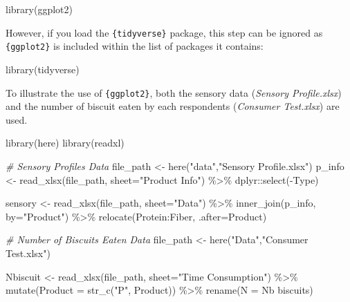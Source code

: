 \documentclass[
]{book}
\newenvironment{Shaded}{\begin{snugshade}}{\end{snugshade}}
\newcommand{\AttributeTok}[1]{\textcolor[rgb]{0.77,0.63,0.00}{#1}}
\newcommand{\CommentTok}[1]{\textcolor[rgb]{0.56,0.35,0.01}{\textit{#1}}}
\newcommand{\FunctionTok}[1]{\textcolor[rgb]{0.00,0.00,0.00}{#1}}
\newcommand{\NormalTok}[1]{#1}
\newcommand{\OtherTok}[1]{\textcolor[rgb]{0.56,0.35,0.01}{#1}}
\newcommand{\SpecialCharTok}[1]{\textcolor[rgb]{0.00,0.00,0.00}{#1}}
\newcommand{\StringTok}[1]{\textcolor[rgb]{0.31,0.60,0.02}{#1}}
\begin{document}
\begin{Shaded}
\begin{Highlighting}[]
\FunctionTok{library}\NormalTok{(ggplot2)}
\end{Highlighting}
\end{Shaded}

However, if you load the \texttt{\{tidyverse\}} package, this step can be ignored as \texttt{\{ggplot2\}} is included within the list of packages it contains:

\begin{Shaded}
\begin{Highlighting}[]
\FunctionTok{library}\NormalTok{(tidyverse)}
\end{Highlighting}
\end{Shaded}

To illustrate the use of \texttt{\{ggplot2\}}, both the sensory data (\emph{Sensory Profile.xlsx}) and the number of biscuit eaten by each respondents (\emph{Consumer Test.xlsx}) are used.

\begin{Shaded}
\begin{Highlighting}[]
\FunctionTok{library}\NormalTok{(here)}
\FunctionTok{library}\NormalTok{(readxl)}

\CommentTok{\# Sensory Profiles Data}
\NormalTok{file\_path }\OtherTok{\textless{}{-}} \FunctionTok{here}\NormalTok{(}\StringTok{"data"}\NormalTok{,}\StringTok{"Sensory Profile.xlsx"}\NormalTok{) }
\NormalTok{p\_info }\OtherTok{\textless{}{-}} \FunctionTok{read\_xlsx}\NormalTok{(file\_path, }\AttributeTok{sheet=}\StringTok{"Product Info"}\NormalTok{) }\SpecialCharTok{\%\textgreater{}\%} 
\NormalTok{  dplyr}\SpecialCharTok{::}\FunctionTok{select}\NormalTok{(}\SpecialCharTok{{-}}\NormalTok{Type)}

\NormalTok{sensory }\OtherTok{\textless{}{-}} \FunctionTok{read\_xlsx}\NormalTok{(file\_path, }\AttributeTok{sheet=}\StringTok{"Data"}\NormalTok{) }\SpecialCharTok{\%\textgreater{}\%} 
  \FunctionTok{inner\_join}\NormalTok{(p\_info, }\AttributeTok{by=}\StringTok{"Product"}\NormalTok{) }\SpecialCharTok{\%\textgreater{}\%} 
  \FunctionTok{relocate}\NormalTok{(Protein}\SpecialCharTok{:}\NormalTok{Fiber, }\AttributeTok{.after=}\NormalTok{Product)}

\CommentTok{\# Number of Biscuits Eaten Data}
\NormalTok{file\_path }\OtherTok{\textless{}{-}} \FunctionTok{here}\NormalTok{(}\StringTok{"Data"}\NormalTok{,}\StringTok{"Consumer Test.xlsx"}\NormalTok{)}

\NormalTok{Nbiscuit }\OtherTok{\textless{}{-}} \FunctionTok{read\_xlsx}\NormalTok{(file\_path, }\AttributeTok{sheet=}\StringTok{"Time Consumption"}\NormalTok{) }\SpecialCharTok{\%\textgreater{}\%} 
  \FunctionTok{mutate}\NormalTok{(}\AttributeTok{Product =} \FunctionTok{str\_c}\NormalTok{(}\StringTok{"P"}\NormalTok{, Product)) }\SpecialCharTok{\%\textgreater{}\%} 
  \FunctionTok{rename}\NormalTok{(}\AttributeTok{N =} \StringTok{\textasciigrave{}}\AttributeTok{Nb biscuits}\StringTok{\textasciigrave{}}\NormalTok{)}
\end{Highlighting}
\end{Shaded}
\end{document}
